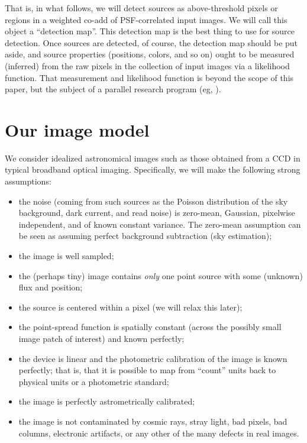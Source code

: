 \documentclass[letterpaper,preprint]{aastex62}
\begin{document}


That is, in what follows, we will detect sources as above-threshold
pixels or regions in a weighted co-add of PSF-correlated input images.
We will call this object a ``detection map''.  This detection map is
the best thing to use for source detection.  Once sources are
detected, of course, the detection map should be put aside, and source
properties (positions, colors, and so on) ought to be measured
(inferred) from the raw pixels in the collection of input images via a
likelihood function.  That measurement and likelihood function is
beyond the scope of this paper, but the subject of a parallel research
program (eg, \cite{unwise-phot}).

\section{Our image model}

We consider idealized astronomical images such as those obtained from
a CCD in typical broadband optical imaging.
Specifically, we will make the following strong assumptions:
\begin{itemize}
\item the noise (coming from such sources as the Poisson distribution
  of the sky background, dark current, and read noise) is zero-mean,
  Gaussian, pixelwise independent, and of known constant variance.  The
  zero-mean assumption can be seen as assuming perfect background
  subtraction (sky estimation);
\item the image is well sampled;
\item the (perhaps tiny) image contains \emph{only} one point
  source with some (unknown) flux and position;
\item the source is centered within a pixel (we will relax this
  later);
\item the point-spread function is spatially constant (across the
  possibly small image patch of interest) and known perfectly;
\item the device is linear and the photometric calibration of the
  image is known perfectly; that is, that it is possible to map from
  ``count'' units back to physical units or a photometric standard;
\item the image is perfectly astrometrically calibrated;
\item the image is not contaminated by cosmic rays, stray light, bad
  pixels, bad columns, electronic artifacts, or any other of the many
  defects in real images.
\end{itemize}
\end{document}
